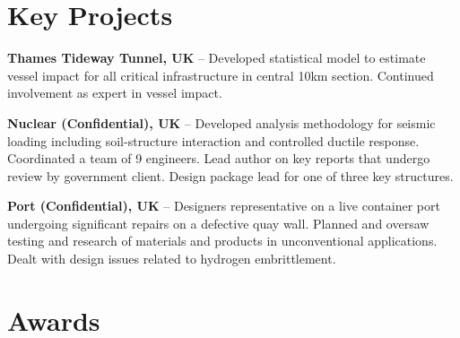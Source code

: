\documentclass[letterpaper]{twentysecondcv} %
\begin{document}
\section{Key Projects}

\textbf{Thames Tideway Tunnel, UK} – Developed statistical model to estimate vessel impact for all critical infrastructure in central 10km section. Continued involvement as expert in vessel impact.

\textbf{Nuclear (Confidential), UK} – Developed analysis methodology for seismic loading including soil-structure interaction and controlled ductile response. Coordinated a team of 9 engineers. Lead author on key reports that undergo review by government client. Design package lead for one of three key structures.

\textbf{Port (Confidential), UK} – Designers representative on a live container port undergoing significant repairs on a defective quay wall. Planned and oversaw testing and research of materials and products in unconventional applications. Dealt with design issues related to hydrogen embrittlement.


\section{Awards}
\end{document}
